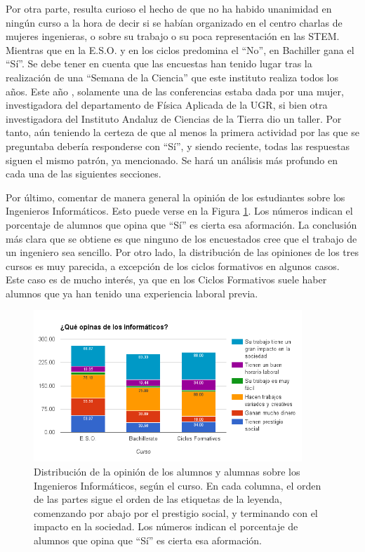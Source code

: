 \documentclass[runningheads,a4paper]{llncs}
\begin{document}
Por otra parte, resulta curioso el hecho de que no ha habido unanimidad en ningún curso a la hora de decir si se habían organizado en el centro charlas de mujeres ingenieras, o sobre su trabajo o su poca representación en las STEM. Mientras que en la E.S.O. y en los ciclos predomina el ``No'', en Bachiller gana el ``Sí''. Se debe tener en cuenta que las encuestas han tenido lugar tras la realización de una ``Semana de la Ciencia'' que este instituto realiza todos los años. Este año \cite{ieszv:blog}, solamente una de las conferencias estaba dada por una mujer, investigadora del departamento de Física Aplicada de la UGR, si bien otra investigadora del Instituto Andaluz de Ciencias de la Tierra dio un taller. Por tanto, aún teniendo la certeza de que al menos la primera actividad por las que se preguntaba debería responderse con ``Sí'', y siendo reciente, todas las respuestas siguen el mismo patrón, ya mencionado. Se hará un análisis más profundo en cada una de las siguientes secciones.

Por último, comentar de manera general la opinión de los estudiantes sobre los Ingenieros Informáticos. Esto puede verse en la Figura \ref{fig:opiniones}. Los números indican el porcentaje de alumnos que opina que ``Sí'' es cierta esa aformación. La conclusión más clara que se obtiene es que ninguno de los encuestados cree que el trabajo de un ingeniero sea sencillo. Por otro lado, la distribución de las opiniones de los tres cursos es muy parecida, a excepción de los ciclos formativos en algunos casos. Este caso es de mucho interés, ya que en los Ciclos Formativos suele haber alumnos que ya han tenido una experiencia laboral previa.

\begin{figure}
  \begin{center}
    \includegraphics[width=0.9\textwidth]{Bitmap/opiniones.png}
    \caption{{\scriptsize Distribución de la opinión de los alumnos y alumnas sobre los Ingenieros Informáticos, según el curso. En cada columna, el orden de las partes sigue el orden de las etiquetas de la leyenda, comenzando por abajo por el prestigio social, y terminando con el impacto en la sociedad. Los números indican el porcentaje de alumnos que opina que ``Sí'' es cierta esa aformación.}}
    \label{fig:opiniones}
  \end{center}
\end{figure}
\end{document}
